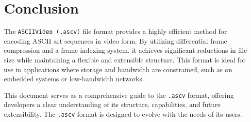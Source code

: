 \documentclass{article}
\begin{document}
\section{Conclusion}

The \texttt{ASCIIVideo (.ascv)} file format provides a highly efficient method for encoding ASCII art sequences in video form. By utilizing differential frame compression and a frame indexing system, it achieves significant reductions in file size while maintaining a flexible and extensible structure. This format is ideal for use in applications where storage and bandwidth are constrained, such as on embedded systems or low-bandwidth networks.

This document serves as a comprehensive guide to the \texttt{.ascv} format, offering developers a clear understanding of its structure, capabilities, and future extensibility. The \texttt{.ascv} format is designed to evolve with the needs of its users.

\clearpage
\printbibliography[
title={References}
]
\end{document}
